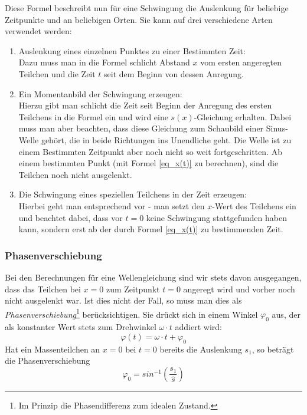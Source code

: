 Diese Formel beschreibt nun für eine Schwingung die Auslenkung für beliebige Zeitpunkte und an beliebigen Orten. Sie kann auf drei verschiedene Arten verwendet werden:
\begin{enumerate}
 \item Auslenkung eines einzelnen Punktes zu einer Bestimmten Zeit:\\
	Dazu muss man in die Formel schlicht Abstand \(x\) vom ersten angeregten Teilchen und die Zeit \(t\) seit dem Beginn von dessen Anregung.

\item Ein Momentanbild der Schwingung erzeugen:\\
	Hierzu gibt man schlicht die Zeit seit Beginn der Anregung des ersten Teilchens in die Formel ein und wird eine \(s(x)\)-Gleichung erhalten. Dabei muss man aber beachten, dass diese Gleichung zum Schaubild einer Sinus-Welle gehört, die in beide Richtungen ins Unendliche geht. Die Welle ist zu einem Bestimmten Zeitpunkt aber noch nicht so weit fortgeschritten. Ab einem bestimmten Punkt (mit Formel \ref{eq_x(t)} zu berechnen), sind die Teilchen noch nicht ausgelenkt.

\item Die Schwingung eines speziellen Teilchens in der Zeit erzeugen:\\
	Hierbei geht man entsprechend vor - man setzt den \(x\)-Wert des Teilchens ein und beachtet dabei, dass vor \(t = 0\) keine Schwingung stattgefunden haben kann, sondern erst ab der durch Formel \ref{eq_x(t)} zu bestimmenden Zeit.
\end{enumerate}




\subsubsection{Phasenverschiebung}

Bei den Berechnungen für eine Wellengleichung sind wir stets davon ausgegangen, dass das Teilchen bei \(x = 0\) zum Zeitpunkt \(t = 0\) angeregt wird und vorher noch nicht ausgelenkt war. Ist dies nicht der Fall, so muss man dies als \emph{Phasenverschiebung}\footnote{Im Prinzip die Phasendifferenz zum idealen Zustand.} berücksichtigen. Sie drückt sich in einem Winkel \(\varphi_0\) aus, der als konstanter Wert stets zum Drehwinkel \(\omega \cdot t\) addiert wird:
\begin{equation}
 	\varphi(t) = \omega \cdot t + \varphi_0
\end{equation}
Hat ein Massenteilchen an \(x = 0\) bei \(t = 0\) bereits die Auslenkung \(s_1\), so beträgt die Phasenverschiebung 
\begin{equation}
 	\varphi_0 = sin^{-1}\left (\frac{s_1}{\hat{s}} \right )
\end{equation}








